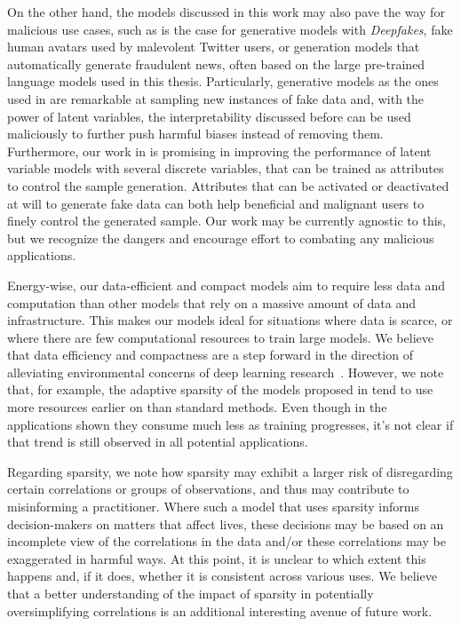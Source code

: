 On the other hand, the models discussed in this work may
also pave the way for malicious use cases, such as is the case for generative models with
\emph{Deepfakes}, fake human avatars used by malevolent Twitter
users, or generation models that automatically generate fraudulent news,
often based on the large pre-trained language models used in this thesis.
Particularly, generative models as the ones used in 
are remarkable at sampling new instances of fake data and, with the
power of latent variables, the interpretability discussed before can
be used maliciously to further push harmful biases instead of
removing them. Furthermore, our work in  is promising in improving the
performance of latent variable models with several discrete
variables, that can be trained as attributes to control the sample
generation. Attributes that can be activated or deactivated at will
to generate fake data can both help beneficial and malignant users to
finely control the generated sample. Our work may be currently
agnostic to this, but we recognize the dangers and encourage effort to
combating any malicious applications.

Energy-wise, our data-efficient and compact models aim to require
less data and computation than other models that rely on a massive
amount of data and infrastructure. This makes our models ideal for
situations where data is scarce, or where there are few computational
resources to train large models. We believe that data efficiency and
compactness are a step forward in the direction of alleviating
environmental concerns of deep learning
research~\citep{strubell2019energy}. However, we note that, for
example, the adaptive sparsity of the models proposed in
 tend to use more resources earlier on
than standard methods. Even though in the applications shown
they consume much less as training progresses, it's not clear if that
trend is still observed in all potential applications.

Regarding sparsity, we note how sparsity may exhibit a larger risk of
disregarding certain correlations or groups of observations,
and thus may contribute to misinforming a practitioner.
Where such a model that uses sparsity informs decision-makers on matters that affect
lives, these decisions may be based on an incomplete view of the
correlations in the data and/or these correlations may be exaggerated
in harmful ways.
At this point, it is
unclear to which extent this happens and, if it does, whether it is
consistent across various uses. We believe that a better understanding
of the impact of sparsity in potentially oversimplifying correlations is an
additional interesting avenue of future work.


\cleardoublepage

\singlespacing